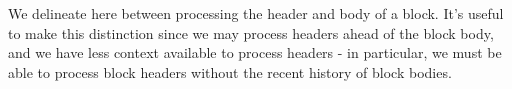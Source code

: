 \documentclass[11pt,a4paper]{article}
\newcommand{\fun}[1]{\mathsf{#1}}
\newcommand{\type}[1]{\mathsf{#1}}
\newcommand{\pp}[1]{\mathsf{#1}}
\begin{document}
\newcommand{\BHEnv}{\type{BHEnv}}
\newcommand{\BHState}{\type{BHState}}

\newcommand{\BBEnv}{\type{BBEnv}}
\newcommand{\BBState}{\type{BBState}}

\newcommand{\Bhead}{\type{BlockHeader}}
\newcommand{\Bbody}{\type{BlockBody}}
\newcommand{\Bhtosign}{\type{BHToSign}}

\newcommand{\bheadname}{bHead}
\newcommand{\bhead}[1]{\fun{\bheadname}\ #1}
\newcommand{\bhhashname}{bhHash}
\newcommand{\bhhash}[1]{\fun{\bhhashname}\ #1}
\newcommand{\bhprevhashname}{bhPrevHash}
\newcommand{\bhprevhash}[1]{\fun{\bhprevhashname}\ #1}
\newcommand{\bhtosignname}{bhToSign}
\newcommand{\bhtosign}[1]{\fun{\bhtosignname}\ #1}
\newcommand{\bhslotname}{bhSlot}
\newcommand{\bhslot}[1]{\fun{\bhslotname}\ #1}
\newcommand{\bupdpayloadname}{bUpdPayload}
\newcommand{\bupdpayload}[1]{\fun{\bupdpayloadname}\ #1}

\newcommand{\bslotname}{bSlot}
\newcommand{\bslot}[1]{\fun{\bslotname}\ #1}

\newcommand{\butxo}[1]{\fun{bUtxo}\ #1}

\newcommand{\maxblocksize}{\pp{maxBlockSize}}
\newcommand{\maxheadersize}{\pp{maxHeaderSize}}

\newcommand{\UTxO}{\type{UTxO}}
\newcommand{\DIEnv}{\type{DIEnv}}
\newcommand{\DIState}{\type{DIState}}

We delineate here between processing the header and body of a block. It's useful
to make this distinction since we may process headers ahead of the
block body, and we have less context available to process headers - in
particular, we must be able to process block headers without the recent history
of block bodies.
\end{document}
